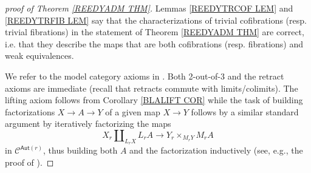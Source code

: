 \documentclass[a4paper,10pt
,draft
]{article}%
\begin{document}
\begin{proof}[proof of Theorem \ref{REEDYADM THM}]
Lemmas \ref{REEDYTRCOF LEM} and \ref{REEDYTRFIB LEM} say that the characterizations of trivial cofibrations (resp. trivial fibrations) in the statement of Theorem \ref{REEDYADM THM} are correct, i.e. that they describe the maps that are both cofibrations (resp. fibrations) and weak equivalences.	

	We refer to the model category axioms in \cite[Def. 1.1.3]{Hov99}. 	
	Both 2-out-of-3 and the retract axioms are immediate
(recall that retracts commute with limits/colimits).	
	The lifting axiom follows from Corollary \ref{BLALIFT COR}
	while the task of building factorizations $X \to A \to Y$ of a given map $X \to Y$ follows by a similar standard argument by iteratively factorizing the maps
\[
	X_r \amalg_{L_r X} L_r A \to Y_r \times_{M_r Y} M_r A
\]
in $\mathcal{C}^{\mathsf{Aut}(r)}$, 
thus building both $A$ and the factorization inductively (see, e.g., the proof of \cite[Thm. 1.6]{BM11}).
\end{proof}








{}




\end{document}
